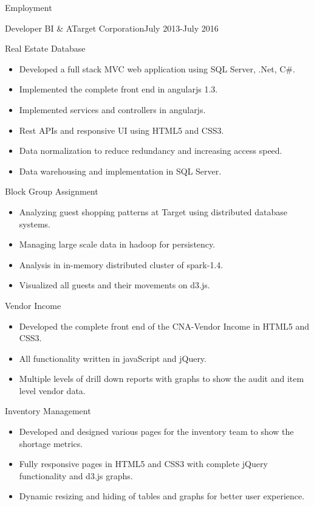 \documentclass[]{nakulcv}
\begin{document}
	\makeheader
	
	\begin{cvsection}{Employment}
		\begin{cvsubsection}{Developer BI \& A}{Target Corporation}{July 2013-July 2016}
		\begin{cvsubsection}{Real Estate Database}{}{}
				\begin{itemize}
					\item	Developed a full stack MVC web application using SQL Server, .Net, C\#.
					\item Implemented the complete front end in angularjs 1.3.
					\item Implemented services and controllers in angularjs.
					\item Rest APIs and responsive UI using HTML5 and CSS3.
					\item Data normalization to reduce redundancy and increasing access speed.
					\item Data warehousing and implementation in SQL Server.
				\end{itemize}
			\end{cvsubsection}
			\begin{cvsubsection}{Block Group Assignment}{}{}
				\begin{itemize}
					\item Analyzing guest shopping patterns at Target using distributed database systems.
					\item Managing large scale data in hadoop for persistency.
					\item Analysis in in-memory distributed cluster of spark-1.4.
					\item Visualized all guests and their movements on d3.js.
				\end{itemize}
			\end{cvsubsection}
			\begin{cvsubsection}{Vendor Income}{}{}
				\begin{itemize}
					\item Developed the complete front end of the CNA-Vendor Income in HTML5 and CSS3.
					\item All functionality written in javaScript and jQuery.
					\item Multiple levels of drill down reports with graphs to show the audit and item level vendor data.
				\end{itemize}
			\end{cvsubsection}
			\begin{cvsubsection}{Inventory Management}{}{}
				\begin{itemize}
					\item Developed and designed various pages for the inventory team to show the shortage metrics.
					\item Fully responsive pages in HTML5 and CSS3 with complete jQuery functionality and d3.js graphs.
					\item Dynamic resizing and hiding of tables and graphs for better user experience. 
				\end{itemize}
			\end{cvsubsection}
		\end{cvsubsection}
		\end{cvsection}
\end{document}
